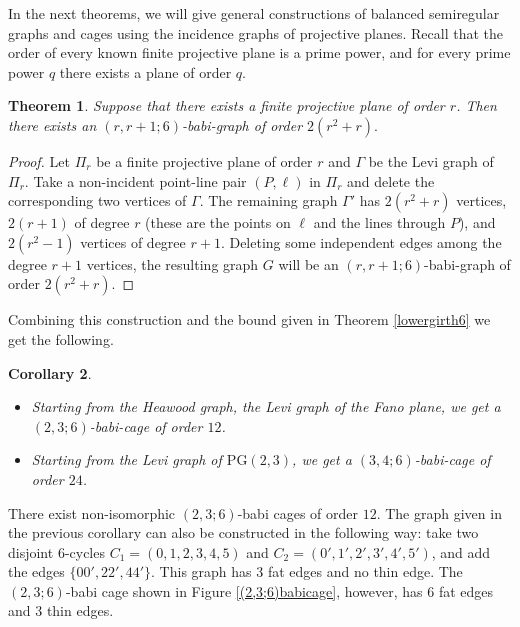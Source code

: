 \documentclass[a4paper,11pt]{article}
\newtheorem{theorem}{Theorem}[section]
\newtheorem{corollary}[theorem]{Corollary}
\begin{document}

In the next theorems, we will give general constructions of balanced semiregular graphs and cages using the incidence graphs of projective planes. Recall that the order of every known finite projective plane is a prime power, and for every prime power $q$ there exists a plane of order $q$.

\begin{theorem}
Suppose that there exists a finite projective plane of order $r$. Then there exists an 
$(r,r+1;6)$-babi-graph of order $2(r^2+r).$
\end{theorem}

\begin{proof}
Let $\Pi _r$ be a finite projective plane of order $r$ and $\Gamma $ be the Levi graph of 
$\Pi _r$. Take a non-incident point-line pair $(P, \ell )$ in $\Pi _r$ and delete the corresponding two vertices of $\Gamma $. The remaining graph $\Gamma '$ has $2(r^2+r)$ vertices, $2(r+1)$ of degree $r$ (these are the points on $\ell $ and the lines
through $P$), and $2(r^2-1)$ vertices of degree $r+1$. Deleting some independent 
edges among the degree $r+1$ vertices, the resulting graph $G$ will be an  
$(r,r+1;6)$-babi-graph of order $2(r^2+r)$.
\end{proof}

Combining this construction and the bound given in Theorem \ref{lowergirth6} we get the following.

\begin{corollary}
$ $ \begin{itemize}
\item
Starting from the Heawood graph, the Levi graph of the Fano plane, we get
a $(2,3;6)$-babi-cage of order $12$.
\item
Starting from the Levi graph of $\mathrm{PG}(2,3)$, we get
a $(3,4;6)$-babi-cage of order $24$.
\end{itemize}
\end{corollary}

There exist non-isomorphic $(2,3;6)$-babi cages of order $12$. The graph given in the previous corollary 
can also be constructed in the following way:
take two disjoint $6$-cycles $C_1=(0,1,2,3,4,5)$ and $C_2=(0',1',2',3',4',5')$, and add the edges
$\{00',22',44'\}$. This graph has 3 fat edges and no thin edge. The $(2,3;6)$-babi cage shown in Figure 
\ref{(2,3;6)babicage}, however, has 6 fat edges and 3 thin edges.
\end{document}
